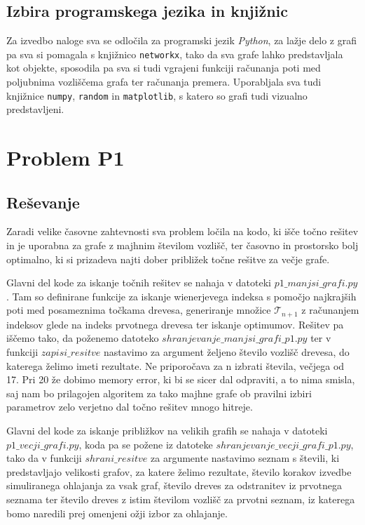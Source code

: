 \documentclass[a4paper, 12 pt]{article}
\begin{document}
\subsection{Izbira programskega jezika in knjižnic}

Za izvedbo naloge sva se odločila za programski jezik \textit{Python}, za lažje delo z grafi pa sva si pomagala s knjižnico \texttt{networkx}, tako da sva grafe lahko predstavljala kot objekte, sposodila pa sva si tudi vgrajeni funkciji računanja poti med poljubnima vozliščema grafa ter računanja premera. Uporabljala sva tudi knjižnice \texttt{numpy}, \texttt{random} in \texttt{matplotlib}, s katero so grafi tudi vizualno predstavljeni.



\pagebreak

\section{Problem P1}

\subsection{Reševanje}

Zaradi velike časovne zahtevnosti sva problem ločila na kodo, ki išče točno rešitev in je uporabna za grafe z majhnim številom vozlišč, ter časovno in prostorsko bolj optimalno, ki si prizadeva najti dober približek točne rešitve za večje grafe.
\vspace{0.5cm}

Glavni del kode za iskanje točnih rešitev se nahaja v datoteki $p1\_manjsi\_grafi.py$. Tam so definirane funkcije za iskanje wienerjevega indeksa s pomočjo najkrajših poti med posameznima točkama drevesa, generiranje množice $\mathscr{T}_{n+1}$  z računanjem indeksov glede na indeks prvotnega drevesa ter iskanje optimumov. Rešitev pa iščemo tako, da poženemo datoteko $shranjevanje\_manjsi\_grafi\_p1.py$ ter v funkciji $zapisi\_resitve$ nastavimo za argument željeno število vozlišč drevesa, do katerega želimo imeti rezultate. Ne priporočava za n izbrati števila, večjega od 17. Pri 20 že dobimo memory error, ki bi se sicer dal odpraviti, a to nima smisla, saj nam bo prilagojen algoritem za tako majhne grafe ob pravilni izbiri parametrov zelo verjetno dal točno rešitev mnogo hitreje.
\vspace{0.5cm}

Glavni del kode za iskanje približkov na velikih grafih se nahaja v datoteki $p1\_vecji\_grafi.py$, koda pa se požene iz datoteke $shranjevanje\_vecji\_grafi\_p1.py$, tako da v funkciji $shrani\_resitve$ za argumente nastavimo seznam s števili, ki predstavljajo velikosti grafov, za katere želimo rezultate, število korakov izvedbe simuliranega ohlajanja za vsak graf, število dreves za odstranitev iz prvotnega seznama ter število dreves z istim številom vozlišč za prvotni seznam, iz katerega bomo naredili prej omenjeni ožji izbor za ohlajanje.
\vspace{0.5cm}
\end{document}
